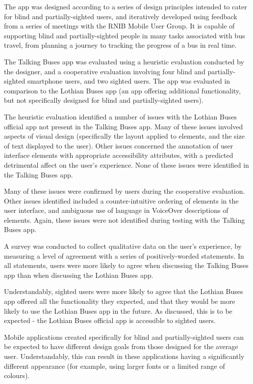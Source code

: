 \documentclass[10pt,twocolumn]{article}
\begin{document}
The app was designed according to a series of design principles intended to cater for blind and partially-sighted users, and iteratively developed using feedback from a series of meetings with the RNIB Mobile User Group. It is capable of supporting blind and partially-sighted people in many tasks associated with bus travel, from planning a journey to tracking the progress of a bus in real time.

The Talking Buses app was evaluated using a heuristic evaluation conducted by the designer, and a cooperative evaluation involving four blind and partially-sighted smartphone users, and two sighted users. The app was evaluated in comparison to the Lothian Buses app (an app offering additional functionality, but not specifically designed for blind and partially-sighted users).

The heuristic evaluation identified a number of issues with the Lothian Buses official app not present in the Talking Buses app. Many of these issues involved aspects of visual design (specifically the layout applied to elements, and the size of text displayed to the user). Other issues concerned the annotation of user interface elements with appropriate accessibility attributes, with a predicted detrimental affect on the user's experience. None of these issues were identified in the Talking Buses app.

Many of these issues were confirmed by users during the cooperative evaluation. Other issues identified included a counter-intuitive ordering of elements in the user interface, and ambiguous use of language in VoiceOver descriptions of elements. Again, these issues were not identified during testing with the Talking Buses app.

A survey was conducted to collect qualitative data on the user's experience, by measuring a level of agreement with a series of positively-worded statements. In all statements, users were more likely to agree when discussing the Talking Buses app than when discussing the Lothian Buses app.

Understandably, sighted users were more likely to agree that the Lothian Buses app offered all the functionality they expected, and that they would be more likely to use the Lothian Buses app in the future. As discussed, this is to be expected - the Lothian Buses official app is accessible to sighted users.

Mobile applications created specifically for blind and partially-sighted users can be expected to have different design goals from those designed for the average user. Understandably, this can result in these applications having a significantly different appearance (for example, using larger fonts or a limited range of colours).  
\end{document}

